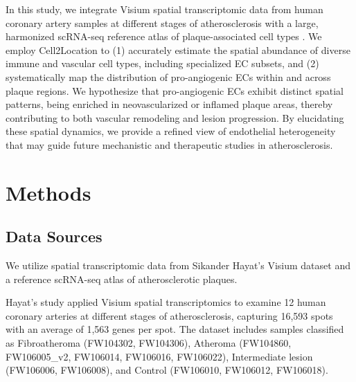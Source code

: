\documentclass[a4paper,12pt]{article}
\begin{document}
In this study, we integrate Visium spatial transcriptomic data from human coronary artery samples at different stages of atherosclerosis with a large, harmonized scRNA-seq reference atlas of plaque-associated cell types \citep{Traeuble2024-de}. We employ Cell2Location to (1) accurately estimate the spatial abundance of diverse immune and vascular cell types, including specialized EC subsets, and (2) systematically map the distribution of pro-angiogenic ECs within and across plaque regions. We hypothesize that pro-angiogenic ECs exhibit distinct spatial patterns, being enriched in neovascularized or inflamed plaque areas, thereby contributing to both vascular remodeling and lesion progression. By elucidating these spatial dynamics, we provide a refined view of endothelial heterogeneity that may guide future mechanistic and therapeutic studies in atherosclerosis.

\section{Methods}
\subsection{Data Sources}
We utilize spatial transcriptomic data from Sikander Hayat’s Visium dataset and a reference scRNA-seq atlas of atherosclerotic plaques.

Hayat’s study applied Visium spatial transcriptomics to examine 12 human coronary arteries at different stages of atherosclerosis, capturing 16,593 spots with an average of 1,563 genes per spot. The dataset includes samples classified as Fibroatheroma (FW104302, FW104306), Atheroma (FW104860, FW106005\_v2, FW106014, FW106016, FW106022), Intermediate lesion (FW106006, FW106008), and Control (FW106010, FW106012, FW106018).
\end{document}
